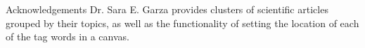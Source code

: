 \documentclass[a0paper, portrait]{baposter}
\begin{document}
\begin{poster}
  \begin{posterbox}[column=2, name=credits, below=ref] {Acknowledgements} {
      Dr. Sara E. Garza\cite {Garza} provides clusters of scientific articles grouped by their topics, as well as the functionality of setting the location of each of the tag words in a canvas.
    }
  \end{posterbox}

\end{poster}
\end{document}
